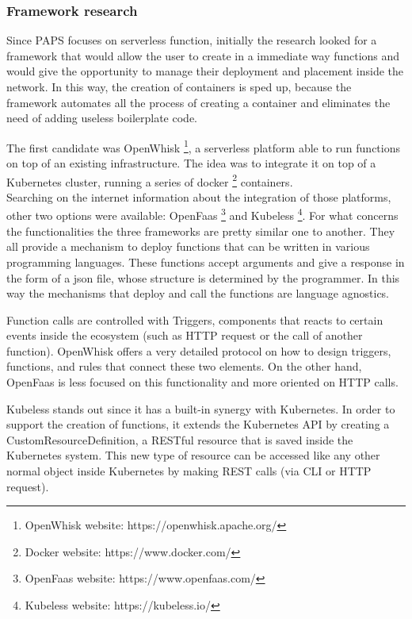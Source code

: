 \subsubsection*{Framework research}


Since PAPS focuses on serverless function, initially the research looked for a framework 
that would allow the user to create in a immediate way functions and would give the opportunity to manage their
deployment and placement inside the network.
In this way, the creation of containers is sped up, because the framework automates all the process
of creating a container and eliminates the need of adding useless boilerplate code.
\par
The first candidate was OpenWhisk \footnote{OpenWhisk website: https://openwhisk.apache.org/}, a serverless platform able to run 
functions on top of an existing infrastructure. The idea was to integrate it on top of a Kubernetes 
cluster, running a series of docker \footnote{Docker website: https://www.docker.com/} containers. \\
Searching on the internet information about the integration of those platforms, other two 
options were available: OpenFaas \footnote{OpenFaas website: https://www.openfaas.com/} and 
Kubeless \footnote{Kubeless website: https://kubeless.io/}. For what concerns 
the functionalities the three frameworks are pretty similar one to another.
They all provide a mechanism to deploy functions that can be written in various programming languages.
These functions accept arguments and give a response in the form of a json file, whose structure
is determined by the programmer. In this way the mechanisms that deploy and call the functions are language agnostics.
\par
Function calls are controlled with Triggers, components that reacts to certain events inside the 
ecosystem (such as HTTP request or the call of another function).
OpenWhisk offers a very detailed protocol on how to design triggers, functions, and rules
that connect these two elements.
On the other hand, OpenFaas is less focused on this functionality and more oriented on HTTP calls.
\par
Kubeless stands out since it has a built-in synergy with Kubernetes. In order to support the creation of functions, 
it extends the Kubernetes API by creating a CustomResourceDefinition, a RESTful resource that is saved inside the Kubernetes
system. This new type of resource can be accessed like any other normal object inside Kubernetes
by making REST calls (via CLI or HTTP request).

